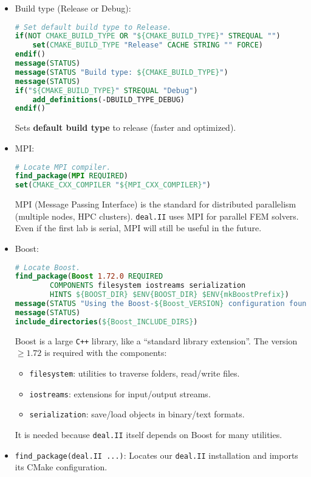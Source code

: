 \begin{itemize}
    \item Build type (Release or Debug):
    \begin{lstlisting}[language=CMake]
# Set default build type to Release.
if(NOT CMAKE_BUILD_TYPE OR "${CMAKE_BUILD_TYPE}" STREQUAL "")
    set(CMAKE_BUILD_TYPE "Release" CACHE STRING "" FORCE)
endif()
message(STATUS)
message(STATUS "Build type: ${CMAKE_BUILD_TYPE}")
message(STATUS)
if("${CMAKE_BUILD_TYPE}" STREQUAL "Debug")
    add_definitions(-DBUILD_TYPE_DEBUG)
endif()\end{lstlisting}
    Sets \textbf{default build type} to release (faster and optimized).


    \item MPI:
    \begin{lstlisting}[language=CMake]
# Locate MPI compiler.
find_package(MPI REQUIRED)
set(CMAKE_CXX_COMPILER "${MPI_CXX_COMPILER}")\end{lstlisting}
    MPI (Message Passing Interface) is the standard for distributed parallelism (multiple nodes, HPC clusters). \texttt{deal.II} uses MPI for parallel FEM solvers. Even if the first lab is serial, MPI will still be useful in the future.


    \item Boost:
    \begin{lstlisting}[language=CMake]
# Locate Boost.
find_package(Boost 1.72.0 REQUIRED
        COMPONENTS filesystem iostreams serialization
        HINTS ${BOOST_DIR} $ENV{BOOST_DIR} $ENV{mkBoostPrefix})
message(STATUS "Using the Boost-${Boost_VERSION} configuration found at ${Boost_DIR}")
message(STATUS)
include_directories(${Boost_INCLUDE_DIRS})\end{lstlisting}
    Boost is a large \texttt{C++} library, like a ``standard library extension''. The version $\ge1.72$ is required with the components:
    \begin{itemize}
        \item \texttt{filesystem}: utilities to traverse folders, read/write files.
        \item \texttt{iostreams}: extensions for input/output streams.
        \item \texttt{serialization}: save/load objects in binary/text formats.
    \end{itemize}
    It is needed because \texttt{deal.II} itself depends on Boost for many utilities.
    
    
    \item \texttt{find\_package(deal.II ...)}: Locates our \texttt{deal.II} installation and imports its CMake configuration.
    

\end{itemize}
